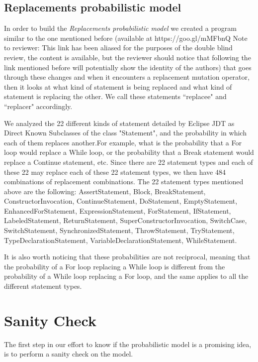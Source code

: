 \documentclass[conference]{IEEEtran}
\begin{document}
\subsection{Replacements probabilistic model}
In order to build the \textit{Replacements probabilistic model} we created a 
program similar to the one mentioned before (available at https://goo.gl/mMFbnQ
Note to reviewer: This link has been aliased for the purposes of the double 
blind review, the content is available, but the reviewer should notice that 
following the link mentioned before will potentially show the identity of the authors) that 
goes through these 
changes and when it encounters a  replacement mutation operator, then it looks 
at what kind of statement is being 
replaced and what kind of statement is replacing the other. We call these 
statements ``replacee" and ``replacer" accordingly.


We analyzed the 22 different kinds of statement detailed by Eclipse JDT as Direct Known Subclasses of the class "Statement", and the probability in which each of 
them replaces another.For example, what is the probability that a For loop 
would replace a While loop, or the probability that a Break statement would 
replace a Continue statement, etc. Since there are 22 statement types and each of these 22 may 
replace each of these 22 statement types, we then have 484 combinations of 
replacement combinations. The 22 statement types mentioned above are the following: AssertStatement, Block, BreakStatement, ConstructorInvocation, ContinueStatement, DoStatement, EmptyStatement, EnhancedForStatement, ExpressionStatement, ForStatement, IfStatement, LabeledStatement, ReturnStatement, SuperConstructorInvocation, SwitchCase, SwitchStatement, SynchronizedStatement, ThrowStatement, TryStatement, TypeDeclarationStatement, VariableDeclarationStatement, WhileStatement.

It is also worth noticing that these probabilities are not reciprocal, meaning 
that the probability of a For loop replacing a While loop is different from the 
probability of a While loop replacing a For loop, and the same applies to all 
the different statement types.


\section{Sanity Check}
The first step in our effort to know if the probabilistic model is a promising idea, is to perform a sanity check on the model.
\end{document}
